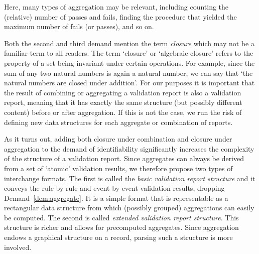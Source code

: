 Here, many types of aggregation may be relevant, including counting the
(relative) number of passes and fails, finding the procedure that yielded the
maximum number of fails (or passes), and so on.

Both the second and third demand mention the term \emph{closure} which may not be a
familiar term to all readers. The term `closure' or `algebraic closure' refers
to the property of a set being invariant under certain operations. For example,
since the sum of any two natural numbers is again a natural number, we can say
that ‘the natural numbers are closed under addition’. For our purposes it is
important that the result of combining or aggregating a validation report is
also a validation report, meaning that it has exactly the same structure (but
possibly different content) before or after aggregation. If this is not the
case, we run the risk of defining new data structures for each aggregate or
combination of reports.

As it turns out, adding both closure under combination and closure under
aggregation to the demand of identifiability significantly increases the
complexity of the structure of a validation report. Since aggregates can always
be derived from a set of `atomic' validation results, we therefore propose two
types of interchange formats. The first is called the \emph{basic validation
report structure} and it conveys the rule-by-rule and event-by-event validation
results, dropping Demand~\ref{dem:aggregate}. It is a simple format that is
representable as a rectangular data structure from which (possibly
grouped) aggregations can easily be computed.  The second is called
\emph{extended validation report structure}. This structure is richer and
allows for precomputed aggregates.  Since aggregation endows a graphical
structure on a record, parsing such a structure is more involved.



